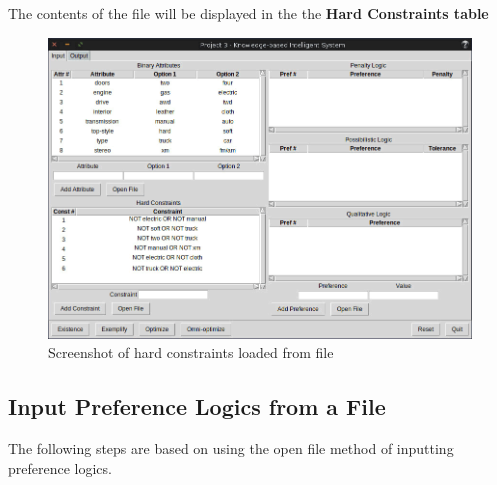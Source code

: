 \documentclass[12pt]{report}
\begin{document}
\begin{description}[leftmargin=4em]
\begin{figure}[H]
\end{figure}
\vspace{-2.5em}
\item [Result:] The contents of the file will be displayed in the the \textbf{Hard Constraints table}
\begin{figure}[H]
\begin{center}
\includegraphics[scale=0.3,trim=1cm 1cm 1cm 1cm]{constraints_imported}
\caption{Screenshot of hard constraints loaded from file}
\end{center}
\end{figure}
\vspace{-2.5em}
\end{description}

\newpage
\subsection{Input Preference Logics from a File}
The following steps are based on using the open file method of inputting preference logics.\\
\end{document}
